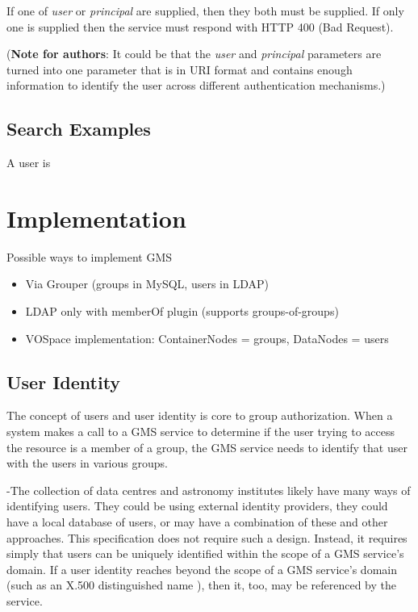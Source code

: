 \documentclass[11pt,a4paper]{ivoa}
\begin{document}
If one of \emph{user} or \emph{principal} are supplied, then they both must be supplied.  If only one is supplied then the service must respond with HTTP 400 (Bad Request).

(\textbf{Note for authors}: It could be that the \emph{user} and \emph{principal} parameters are turned into one parameter that is in URI format and contains enough information to identify the user across different authentication mechanisms.)

\subsection {Search Examples}

A user is


\section {Implementation}

Possible ways to implement GMS

\begin{itemize}
\item Via Grouper (groups in MySQL, users in LDAP)
\item LDAP only with memberOf plugin (supports groups-of-groups)
\item VOSpace implementation: ContainerNodes = groups, DataNodes = users
\end{itemize}

\subsection{User Identity}

The concept of users and user identity is core to group authorization.  When a system makes a call to a GMS service to determine if the user trying to access the resource is a member of a group, the GMS service needs to identify that user with the users in various groups.

-The collection of data centres and astronomy institutes likely have many ways of identifying users.  They could be using external identity providers, they could have a local database of users, or may have a combination of these and other approaches.  This specification does not require such a design.  Instead, it requires simply that users can be uniquely identified within the scope of a GMS service's domain.  If a user identity reaches beyond the scope of a GMS service's domain (such as an X.500 distinguished name \citep{std:RFC1779}), then it, too, may be referenced by the service.
\end{document}
